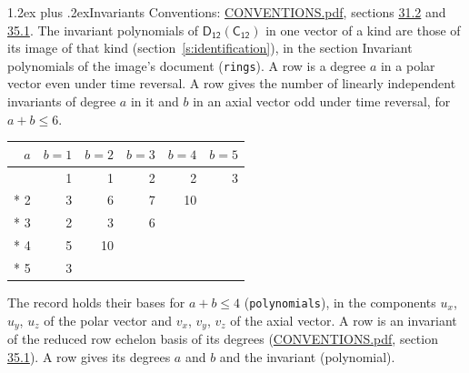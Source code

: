 \documentclass[10pt,a4paper]{article}
\makeatletter
\renewcommand\section{\@startsection{section}{1}{\z@}{-3ex plus -1ex minus -.2ex}%
  {1.2ex plus .2ex}{\normalfont\large\sffamily\bfseries\color{parttitle}}}
\numberwithin{equation}{section}
\newcommand{\grp}[1]{\mathsf{#1}}
\makeatother
\begin{document}
\section{Invariants}\label{s:invariants}
Conventions: \href{../../CONVENTIONS.pdf}{CONVENTIONS.pdf}, sections \href{../../CONVENTIONS.pdf\#conv.31.2}{31.2} and \href{../../CONVENTIONS.pdf\#conv.35.1}{35.1}.
The invariant polynomials of $\grp{D_{12}}(\grp{C_{12}})$ in one vector of a kind are those of its image of that kind (section~\ref{s:identification}), in the section Invariant polynomials of the image's document (\texttt{rings}).
\leavevmode\label{n:index.degree.polar}\label{n:index.degree.axial}A row is a degree $a$ in a polar vector even under time reversal. A row gives the number of linearly independent invariants of degree $a$ in it and $b$ in an axial vector odd under time reversal, for $a + b \le 6$.
{\small\begin{longtable}{@{}rrrrrr@{}}\toprule
$a$ & $b = 1$ & $b = 2$ & $b = 3$ & $b = 4$ & $b = 5$\\\midrule\endhead
\bottomrule\endfoot\endlastfoot
1 & 1 & 1 & 2 & 2 & 3\\*
2 & 3 & 6 & 7 & 10 & \\*
3 & 2 & 3 & 6 &  & \\*
4 & 5 & 10 &  &  & \\*
5 & 3 &  &  &  & \\
\bottomrule\end{longtable}}
\leavevmode\label{n:local.component.polar}\label{n:local.component.axial}The record holds their bases for $a + b \le 4$ (\texttt{polynomials}), in the components $u_{x}$, $u_{y}$, $u_{z}$ of the polar vector and $v_{x}$, $v_{y}$, $v_{z}$ of the axial vector. \label{n:head.polynomial}A row is an invariant of the reduced row echelon basis of its degrees (\href{../../CONVENTIONS.pdf}{CONVENTIONS.pdf}, section \href{../../CONVENTIONS.pdf\#conv.35.1}{35.1}). A row gives its degrees $a$ and $b$ and the invariant (polynomial).
\end{document}

